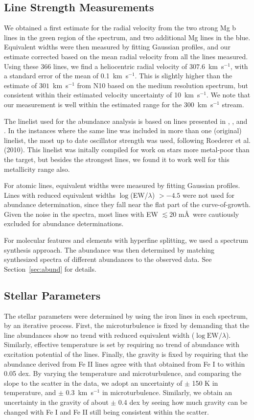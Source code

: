 \documentclass{emulateapj}
\begin{document}
\subsection{Line Strength Measurements}
\label{sec:linemes}
We obtained a first estimate for the radial velocity from the two strong Mg b lines in the green region of the spectrum, and two additional Mg lines in the blue. Equivalent widths were then measured by fitting Gaussian profiles, and our estimate corrected based on the mean radial velocity from all the lines measured. Using these 366 lines, we find a heliocentric radial velocity of $307.6$~km~s$^{-1}$, with a standard error of the mean of 0.1~km~s$^{-1}$. This is slightly higher than the estimate of $301$~km~s$^{-1}$ from N10 based on the medium resolution spectrum, but consistent within their estimated velocity uncertainty of 10~km~s$^{-1}$. We note that our measurement is well within the estimated range for the 300~km~s$^{-1}$ stream.

The linelist used for the abundance analysis is based on lines presented in \citet{Roederer2010}, \citet{Aoki2007b}, and \citet{Cayrel2004}. In the instances where the same
line was included in more than one (original) linelist, the most up to
date oscillator strength was used, following Roederer et al. (2010).
This linelist was initally compiled for work on stars more metal-poor than
the target, but besides the strongest lines, we found it to
work well for this metallicity range also.


For atomic lines, equivalent widths were measured by fitting Gaussian profiles. Lines with reduced equivalent widths $\log$(EW/$\lambda$) $> -4.5$ were not used for abundance determination, since they fall near the flat part of the curve-of-growth. Given the noise in the spectra, most lines with EW $\lesssim 20$ m\AA\,  were cautiously excluded for abundance determinations.

For molecular features and elements with hyperfine splitting, we used a spectrum synthesis approach. The abundance was then determined by matching synthesized spectra of different abundances to the observed data. See Section~\ref{sec:abund} for details.


\subsection{Stellar Parameters}
\label{sec:stpar}
The stellar parameters were determined by using the iron lines in each spectrum, by an iterative process. First, the microturbulence is fixed by demanding that the line abundances show no trend with reduced equivalent width ($\log \mbox{EW}/\lambda$). Similarly, effective temperature is set by requiring no trend of abundance with excitation potential of the lines. Finally, the gravity is fixed by requiring that the abundance derived from Fe II lines agree with that obtained from Fe I to within 0.05 dex. By varying the temperature and microturbulence, and comparing the slope to the scatter in the data, we adopt an uncertainty of $\pm$ 150 K in temperature, and $\pm$ 0.3~km~s$^{-1}$ in microturbulence. Similarly, we obtain an uncertainty in the gravity of about $\pm$ 0.4 dex by seeing how much gravity can be changed with Fe I and Fe II still being consistent within the scatter.
\end{document}

